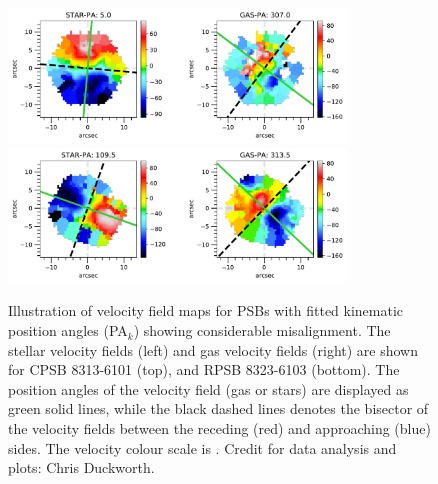 \begin{figure}
    \centering
    \includegraphics[width=0.8\textwidth]{images/PAplots/PAplotsCPSB/8313-6101-PA.pdf}
    \includegraphics[width=0.8\textwidth]{images/PAplots/PAplotsRPSB/8323-6103-PA.pdf}
    \caption[Examples of PSBs showing significant kinematic PA misalignment $\Delta$PA$_{k}$: CPSB 8313-6101 and RPSB 8323-6103.]{Illustration of velocity field maps for PSBs with fitted kinematic position angles (PA$_{k}$) showing considerable misalignment. The stellar velocity fields (left) and gas velocity fields (right) are shown for CPSB 8313-6101 (top), and RPSB 8323-6103 (bottom). The position angles of the velocity field (gas or stars) are displayed as green solid lines, while the black dashed lines denotes the bisector of the velocity fields between the receding (red) and approaching (blue) sides. The velocity colour scale is \kms. Credit for data analysis and plots: Chris Duckworth.}
    \label{fig:CPSB-8313-6101-PA}
\end{figure}


